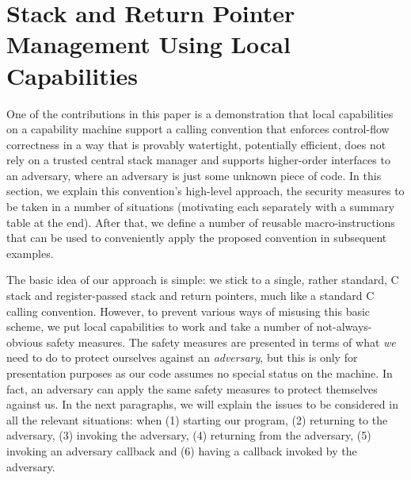\documentclass[format=acmsmall, review=true, screen=true]{acmart}
\newcommand{\itoplassug}[1]{}
\begin{document}
\section{Stack and Return Pointer Management Using Local Capabilities}
\label{sec:stack-and-return-pointer}
\itoplassug{Suggestion: say something about arguments in this paragraph instead of defering it to the discussion only?\\}
\itoplassug{Suggestion: Add some of our presentation illustration figures to illustrate some of the issues? May not be feasible as they rely on ``animation''.\\}
\itoplassug{Suggestion: Include a description of (possibly definition for) well-bracketedness? (requested by reviewer C, popl). Reviewer D, popl, asks for the same but also a definition of local state encapsulation. In the POPL notes, I wrote that I talked with Lars about it and this is something that is not easily defined. Perhaps we should have a discussion of this.\\}
One of the contributions in this paper is a
demonstration that local capabilities on a capability machine support a calling
convention that enforces control-flow correctness in a way that is provably
watertight, potentially efficient, does not rely on a trusted central stack
manager and supports higher-order interfaces to an adversary, where an adversary
is just some unknown piece of code. In this section, we explain this
convention's high-level approach, the security measures to be taken in a number
of situations (motivating each separately with a summary table at the end).
After that, we define a number of reusable macro-instructions that can be used
to conveniently apply the proposed convention in subsequent examples.

The basic idea of our approach is simple: we stick to a single, rather standard,
C stack and register-passed stack and return pointers, much like a standard C
calling convention. However, to prevent various ways of misusing this basic
scheme, we put local capabilities to work and take a number of
not-always-obvious safety measures. The safety measures are presented in terms
of what \emph{we} need to do to protect ourselves against an \emph{adversary},
but this is only for presentation purposes as our code assumes no special status on
the machine. In fact, an adversary can apply the same safety measures to protect
themselves against us. In the next paragraphs, we will explain the issues to be
considered in all the relevant situations: when (1) starting our program, (2)
returning to the adversary, (3) invoking the adversary, (4) returning from the
adversary, (5) invoking an adversary callback and (6) having a callback invoked
by the adversary.
\end{document}
